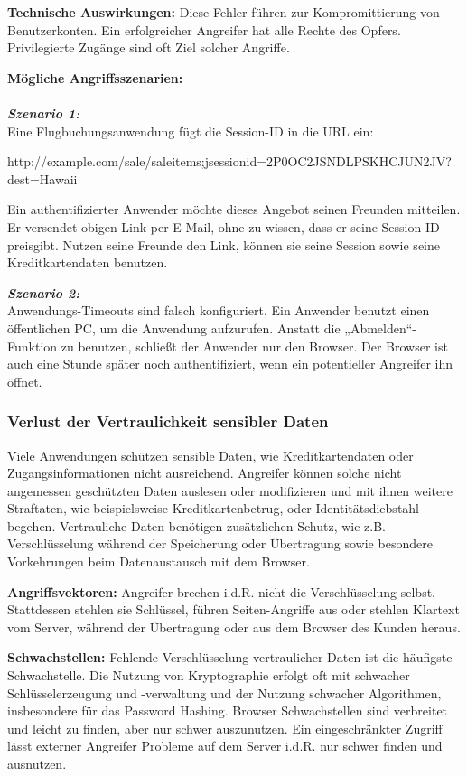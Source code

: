 \textbf{Technische Auswirkungen:} Diese Fehler führen zur Kompromittierung von Benutzerkonten. Ein erfolgreicher Angreifer hat alle Rechte des Opfers. Privilegierte Zugänge sind oft Ziel solcher Angriffe\cite[8]{owasp17top10}.

\textbf{Mögliche Angriffsszenarien:}\\
\\
\textbf{\textit{Szenario 1:}}\\
Eine Flugbuchungsanwendung fügt die Session-ID in die URL ein\cite[8]{owasp17top10}:

http://example.com/sale/saleitems;jsessionid=2P0OC2JSNDLPSKHCJUN2JV?dest=Hawaii

Ein authentifizierter Anwender möchte dieses Angebot seinen Freunden mitteilen. Er versendet obigen Link per E-Mail, ohne zu wissen, dass er seine Session-ID preisgibt. Nutzen seine Freunde den Link, können sie seine Session sowie seine Kreditkartendaten benutzen.

\textbf{\textit{Szenario 2:}}\\
Anwendungs-Timeouts sind falsch konfiguriert. Ein
Anwender benutzt einen öffentlichen PC, um die Anwendung
aufzurufen. Anstatt die „Abmelden“-Funktion zu benutzen, schließt
der Anwender nur den Browser. Der Browser ist auch eine Stunde
später noch authentifiziert, wenn ein potentieller Angreifer ihn
öffnet\cite[8]{owasp17top10}.

\subsubsection{Verlust der Vertraulichkeit sensibler Daten}

Viele Anwendungen schützen sensible Daten, wie Kreditkartendaten oder Zugangsinformationen nicht ausreichend. Angreifer können solche nicht angemessen geschützten Daten auslesen oder modifizieren und mit ihnen weitere Straftaten, wie beispielsweise Kreditkartenbetrug, oder Identitätsdiebstahl begehen. Vertrauliche Daten benötigen zusätzlichen Schutz, wie z.B. Verschlüsselung während der Speicherung oder Übertragung sowie besondere Vorkehrungen beim Datenaustausch mit dem Browser\cite[6]{owasp17top10}.

\textbf{Angriffsvektoren:} Angreifer brechen i.d.R. nicht die Verschlüsselung selbst. Stattdessen stehlen sie Schlüssel, führen
Seiten-Angriffe aus oder stehlen Klartext vom
Server, während der Übertragung oder aus dem Browser des
Kunden heraus\cite[9]{owasp17top10}.

\textbf{Schwachstellen:} Fehlende Verschlüsselung vertraulicher
Daten ist die häufigste Schwachstelle. Die Nutzung von Kryptographie erfolgt oft mit schwacher Schlüsselerzeugung und -verwaltung und der Nutzung schwacher Algorithmen, insbesondere für das Password Hashing. Browser Schwachstellen sind verbreitet
und leicht zu finden, aber nur schwer auszunutzen. Ein eingeschränkter Zugriff lässt externer Angreifer Probleme auf dem Server i.d.R. nur schwer finden und ausnutzen\cite[9]{owasp17top10}.

